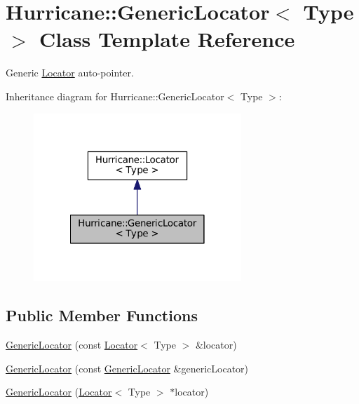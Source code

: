 \hypertarget{classHurricane_1_1GenericLocator}{}\section{Hurricane\+:\+:Generic\+Locator$<$ Type $>$ Class Template Reference}
\label{classHurricane_1_1GenericLocator}


Generic \mbox{\hyperlink{classHurricane_1_1Locator}{Locator}} auto-\/pointer.  




Inheritance diagram for Hurricane\+:\+:Generic\+Locator$<$ Type $>$\+:\nopagebreak
\begin{figure}[H]
\begin{center}
\leavevmode
\includegraphics[width=222pt]{classHurricane_1_1GenericLocator__inherit__graph}
\end{center}
\end{figure}
\subsection*{Public Member Functions}
\begin{DoxyCompactItemize}
\item 
\mbox{\hyperlink{classHurricane_1_1GenericLocator_a878eae335b3f60fc66ec6362d84c2b3e}{Generic\+Locator}} (const \mbox{\hyperlink{classHurricane_1_1Locator}{Locator}}$<$ Type $>$ \&locator)
\item 
\mbox{\hyperlink{classHurricane_1_1GenericLocator_aa314dea86573d1cee1d1eea8ac2ab49e}{Generic\+Locator}} (const \mbox{\hyperlink{classHurricane_1_1GenericLocator}{Generic\+Locator}} \&generic\+Locator)
\item 
\mbox{\hyperlink{classHurricane_1_1GenericLocator_a4706b6502b806f90f2374df76791a729}{Generic\+Locator}} (\mbox{\hyperlink{classHurricane_1_1Locator}{Locator}}$<$ Type $>$ $\ast$locator)
\end{DoxyCompactItemize}


